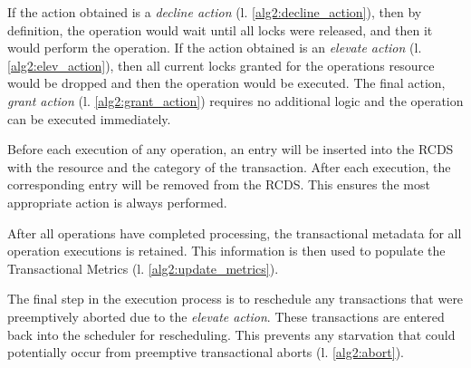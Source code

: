 If the action obtained is a \textit{decline action} (l. \ref{alg2:decline_action}), then by definition, the operation would wait until all locks were released, and then it would perform the operation. If the action obtained is an \textit{elevate action} (l. \ref{alg2:elev_action}), then all current locks granted for the operations resource would be dropped and then the operation would be executed. The final action, \textit{grant action} (l. \ref{alg2:grant_action}) requires no additional logic and the operation can be executed immediately. 


Before each execution of any operation, an entry will be inserted into the \ac{RCDS} with the resource and the category of the transaction. After each execution, the corresponding entry will be removed from the \ac{RCDS}. This ensures the most appropriate action is always performed.

After all operations have completed processing, the transactional metadata for all operation executions is retained. This information is then used to populate the Transactional Metrics (l. \ref{alg2:update_metrics}). 


The final step in the execution process is to reschedule any transactions that were preemptively aborted due to the \textit{elevate action}. These transactions are entered back into the scheduler for rescheduling. This prevents any starvation that could potentially occur from preemptive transactional aborts (l. \ref{alg2:abort}).